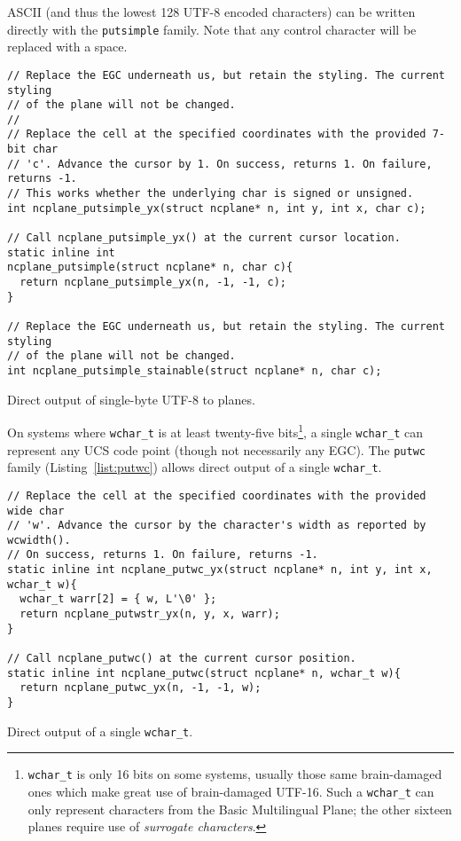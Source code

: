 ASCII (and thus the lowest 128 UTF-8 encoded characters) can be written directly
with the \texttt{putsimple} family. Note that any control character will be replaced with
a space.

\begin{listing}[!htb]
\begin{verbatim}
// Replace the EGC underneath us, but retain the styling. The current styling
// of the plane will not be changed.
//
// Replace the cell at the specified coordinates with the provided 7-bit char
// 'c'. Advance the cursor by 1. On success, returns 1. On failure, returns -1.
// This works whether the underlying char is signed or unsigned.
int ncplane_putsimple_yx(struct ncplane* n, int y, int x, char c);

// Call ncplane_putsimple_yx() at the current cursor location.
static inline int
ncplane_putsimple(struct ncplane* n, char c){
  return ncplane_putsimple_yx(n, -1, -1, c);
}

// Replace the EGC underneath us, but retain the styling. The current styling
// of the plane will not be changed.
int ncplane_putsimple_stainable(struct ncplane* n, char c);
\end{verbatim}
\caption{Direct output of single-byte UTF-8 to planes.}
\label{list:putc}
\end{listing}

On systems where \texttt{wchar\_t} is at least twenty-five bits\footnote{\texttt{wchar\_t}
  is only 16 bits on some systems, usually those same brain-damaged ones which
  make great use of brain-damaged UTF-16. Such a \texttt{wchar\_t} can only
represent characters from the Basic Multilingual Plane; the other sixteen planes
require use of \textit{surrogate characters}.}, a single \texttt{wchar\_t} can
represent any UCS code point (though not necessarily any EGC). The
\texttt{putwc} family (Listing~\ref{list:putwc}) allows direct output of a single \texttt{wchar\_t}.

\begin{listing}[!htb]
\begin{verbatim}
// Replace the cell at the specified coordinates with the provided wide char
// 'w'. Advance the cursor by the character's width as reported by wcwidth().
// On success, returns 1. On failure, returns -1.
static inline int ncplane_putwc_yx(struct ncplane* n, int y, int x, wchar_t w){
  wchar_t warr[2] = { w, L'\0' };
  return ncplane_putwstr_yx(n, y, x, warr);
}

// Call ncplane_putwc() at the current cursor position.
static inline int ncplane_putwc(struct ncplane* n, wchar_t w){
  return ncplane_putwc_yx(n, -1, -1, w);
}
\end{verbatim}
\caption{Direct output of a single \texttt{wchar\_t}.}
\label{list:putwc}
\end{listing}

